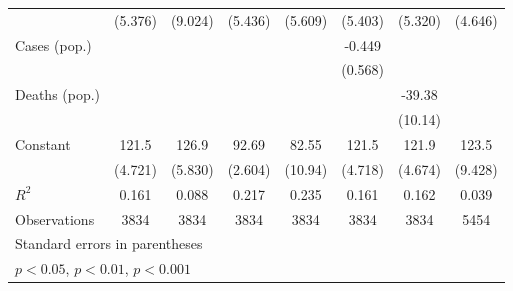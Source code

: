 \documentclass{article}
\begin{document}
{\begin{longtable}{l*{7}{c}}
                &  (5.376)         &  (9.024)         &  (5.436)         &  (5.609)         &  (5.403)         &  (5.320)         &  (4.646)         \\
Cases (pop.)    &                  &                  &                  &                  &   -0.449         &                  &                  \\
                &                  &                  &                  &                  &  (0.568)         &                  &                  \\
Deaths (pop.)   &                  &                  &                  &                  &                  &   -39.38\sym{***}&                  \\
                &                  &                  &                  &                  &                  &  (10.14)         &                  \\
Constant        &    121.5\sym{***}&    126.9\sym{***}&    92.69\sym{***}&    82.55\sym{***}&    121.5\sym{***}&    121.9\sym{***}&    123.5\sym{***}\\
                &  (4.721)         &  (5.830)         &  (2.604)         &  (10.94)         &  (4.718)         &  (4.674)         &  (9.428)         \\
\hline
\(R^{2}\)       &    0.161         &    0.088         &    0.217         &    0.235         &    0.161         &    0.162         &    0.039         \\
Observations    &     3834         &     3834         &     3834         &     3834         &     3834         &     3834         &     5454         \\
\hline\hline
\multicolumn{8}{l}{\footnotesize Standard errors in parentheses}\\
\multicolumn{8}{l}{\footnotesize \sym{*} \(p<0.05\), \sym{**} \(p<0.01\), \sym{***} \(p<0.001\)}\\
\end{longtable}
}
\end{document}
